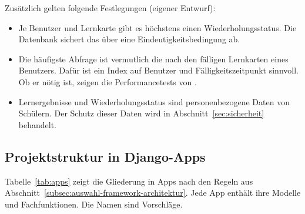 Zusätzlich gelten folgende Festlegungen (eigener Entwurf):
\begin{itemize}
    \item Je Benutzer und Lernkarte gibt es höchstens einen Wiederholungsstatus. Die Datenbank sichert das über eine Eindeutigkeitsbedingung ab.
    \item Die häufigste Abfrage ist vermutlich die nach den fälligen Lernkarten eines Benutzers. Dafür ist ein Index auf Benutzer und Fälligkeitszeitpunkt sinnvoll. Ob er nötig ist, zeigen die Performancetests von \Jai.
    \item Lernergebnisse und Wiederholungsstatus sind personenbezogene Daten von Schülern. Der Schutz dieser Daten wird in Abschnitt~\ref{sec:sicherheit} behandelt.
\end{itemize}

\subsection{Projektstruktur in Django-Apps}
\label{subsec:projektstruktur}
Tabelle~\ref{tab:apps} zeigt die Gliederung in Apps nach den Regeln aus Abschnitt~\ref{subsec:auswahl-framework-architektur}. Jede App enthält ihre Modelle und Fachfunktionen. Die Namen sind Vorschläge.
\begingroup
\small
\setlength{\tabcolsep}{4pt}

